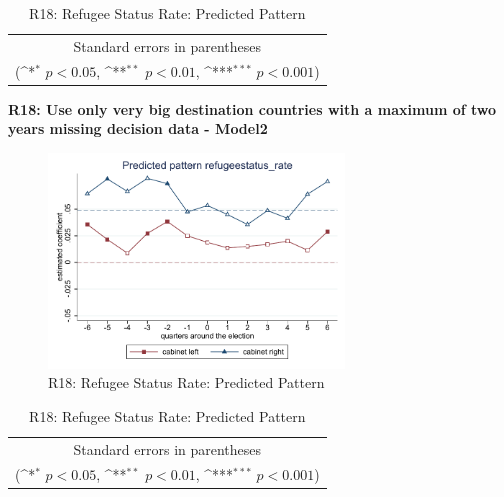 \documentclass[10pt,a4paper]{scrartcl}
\begin{document}
\begin{table}[!ht]\centering
	\renewcommand{\arraystretch}{1.25}
	\def\sym#1{\ifmmode^{#1}\else\(^{#1}\)\fi}
	\caption{R18: Refugee Status Rate: Predicted Pattern}
	\begin{tabular}{l*{2}{c}}
		\hline\hline
		
		\hline\hline
		\multicolumn{3}{c}{\footnotesize Standard errors in parentheses} \\
		\multicolumn{3}{c}{\footnotesize (\sym{*} \(p<0.05\), \sym{**} \(p<0.01\), \sym{***} \(p<0.001\))}\\
	\end{tabular}
\end{table}

\clearpage
\textbf{R18: Use only very big destination countries with a maximum of two years missing decision data - Model2}
\begin{figure}[!ht]
	\centering
	\includegraphics[width=0.7\textwidth]{figures_edited/refugeestatus_rate_graph2_R18.pdf}
	\caption{R18: Refugee Status Rate: Predicted Pattern}
\end{figure}

\begin{table}[!ht]\centering
	\footnotesize
	\renewcommand{\arraystretch}{1.15}
	\def\sym#1{\ifmmode^{#1}\else\(^{#1}\)\fi}
	\caption{R18: Refugee Status Rate: Predicted Pattern}
	\begin{tabular}{l*{2}{c}}
		\hline\hline
		
		\hline\hline
		\multicolumn{3}{c}{\footnotesize Standard errors in parentheses} \\
		\multicolumn{3}{c}{\footnotesize (\sym{*} \(p<0.05\), \sym{**} \(p<0.01\), \sym{***} \(p<0.001\))} \\
	\end{tabular}
\end{table}
\end{document}
